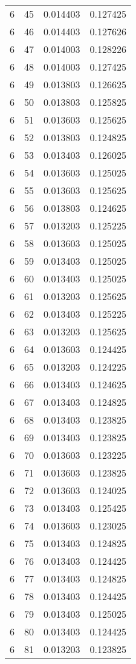 \begin{longtable}{rrrr}
6 & 45 & 0.014403 & 0.127425 \\
6 & 46 & 0.014403 & 0.127626 \\
6 & 47 & 0.014003 & 0.128226 \\
6 & 48 & 0.014003 & 0.127425 \\
6 & 49 & 0.013803 & 0.126625 \\
6 & 50 & 0.013803 & 0.125825 \\
6 & 51 & 0.013603 & 0.125625 \\
6 & 52 & 0.013803 & 0.124825 \\
6 & 53 & 0.013403 & 0.126025 \\
6 & 54 & 0.013603 & 0.125025 \\
6 & 55 & 0.013603 & 0.125625 \\
6 & 56 & 0.013803 & 0.124625 \\
6 & 57 & 0.013203 & 0.125225 \\
6 & 58 & 0.013603 & 0.125025 \\
6 & 59 & 0.013403 & 0.125025 \\
6 & 60 & 0.013403 & 0.125025 \\
6 & 61 & 0.013203 & 0.125625 \\
6 & 62 & 0.013403 & 0.125225 \\
6 & 63 & 0.013203 & 0.125625 \\
6 & 64 & 0.013603 & 0.124425 \\
6 & 65 & 0.013203 & 0.124225 \\
6 & 66 & 0.013403 & 0.124625 \\
6 & 67 & 0.013403 & 0.124825 \\
6 & 68 & 0.013403 & 0.123825 \\
6 & 69 & 0.013403 & 0.123825 \\
6 & 70 & 0.013603 & 0.123225 \\
6 & 71 & 0.013603 & 0.123825 \\
6 & 72 & 0.013603 & 0.124025 \\
6 & 73 & 0.013403 & 0.125425 \\
6 & 74 & 0.013603 & 0.123025 \\
6 & 75 & 0.013403 & 0.124825 \\
6 & 76 & 0.013403 & 0.124425 \\
6 & 77 & 0.013403 & 0.124825 \\
6 & 78 & 0.013403 & 0.124425 \\
6 & 79 & 0.013403 & 0.125025 \\
6 & 80 & 0.013403 & 0.124425 \\
6 & 81 & 0.013203 & 0.123825 \\

\end{longtable}
